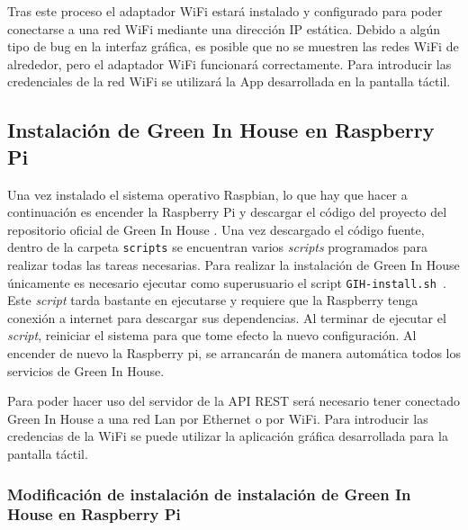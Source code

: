     Tras este proceso el adaptador WiFi estará instalado y configurado para poder conectarse a una red WiFi mediante una dirección IP estática. Debido a algún tipo de bug en la interfaz gráfica, es posible que no se muestren las redes WiFi de alrededor, pero el adaptador WiFi funcionará correctamente. Para introducir las credenciales de la red WiFi se utilizará la App desarrollada en la pantalla táctil.

    \subsection{Instalación de Green In House en Raspberry Pi}
    Una vez instalado el sistema operativo Raspbian, lo que hay que hacer a continuación es encender la Raspberry Pi y descargar el código del proyecto del repositorio oficial de Green In House \cite{GreenInHouse:repo:Maceta}. 
    Una vez descargado el código fuente, dentro de la carpeta \texttt{scripts} se encuentran varios \textit{scripts} programados para realizar todas las tareas necesarias. Para realizar la instalación de Green In House únicamente es necesario ejecutar como superusuario el script \texttt{GIH-install.sh }. Este \textit{script} tarda bastante en ejecutarse y requiere que la Raspberry tenga conexión a internet para descargar sus dependencias. Al terminar de ejecutar el \textit{script}, reiniciar el sistema para que tome efecto la nuevo configuración. Al encender de nuevo la Raspberry pi, se arrancarán de manera automática todos los servicios de Green In House. 
    
    Para poder hacer uso del servidor de la API REST será necesario tener conectado Green In House a una red Lan por Ethernet o por WiFi. Para introducir las credencias de la WiFi se puede utilizar la aplicación gráfica desarrollada para la pantalla táctil.

        \subsubsection{Modificación de instalación de instalación de Green In House en Raspberry Pi}
        

